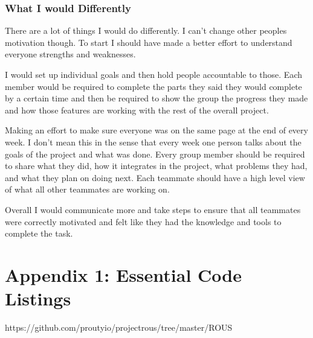 \documentclass[draftclsnofoot, onecolumn, compsoc, 10pt]{IEEEtran}
\begin{document}
\subsubsection{What I would Differently}
There are a lot of things I would do differently. I can't change other peoples motivation though. To start I should have made a better effort to understand everyone strengths and weaknesses. 

I would set up individual goals and then hold people accountable to those. Each member would be required to complete the parts they said they would complete by a certain time and then be required to show the group the progress they made and how those features are working with the rest of the overall project.

Making an effort to make sure everyone was on the same page at the end of every week. I don't mean this in the sense that every week one person talks about the goals of the project and what was done. Every group member should be required to share what they did, how it integrates in the project, what problems they had, and what they plan on doing next. Each teammate should have a high level view of what all other teammates are working on. 

Overall I would communicate more and take steps to ensure that all teammates were correctly motivated and felt like they had the knowledge and tools to complete the task.


\newpage
\section{Appendix 1: Essential Code Listings}
https://github.com/proutyio/projectrous/tree/master/ROUS
\end{document}
